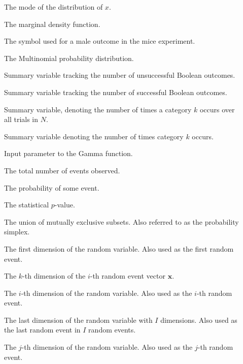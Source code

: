 \begin{description}
	\item [\parbox{2cm}{$M[x]$}] \parbox{12.5cm}{The mode of the distribution of $x$.}
	\item [\parbox{2cm}{$m$}] \parbox{12.5cm}{The marginal density function.}
	\item [\parbox{2cm}{$M$}] \parbox{12.5cm}{The symbol used for a male outcome in the mice experiment.}
	\item [\parbox{2cm}{$Mul$}] \parbox{12.5cm}{The Multinomial probability distribution.}
	\item [\parbox{2cm}{$N_{0}$}] \parbox{12.5cm}{Summary variable tracking the number of unsuccessful Boolean outcomes.}
	\item [\parbox{2cm}{$N_{1}$}] \parbox{12.5cm}{Summary variable tracking the number of successful Boolean outcomes.}
	\item [\parbox{2cm}{$N_{k}$}] \parbox{12.5cm}{Summary variable, denoting the number of times a category $k$ occurs over all trials in $N$.}
	\item [\parbox{2cm}{$N_{K}$}] \parbox{12.5cm}{Summary variable denoting the number of times category $k$ occurs.}
	\item [\parbox{2cm}{$n$}] \parbox{12.5cm}{Input parameter to the Gamma function.}
	\item [\parbox{2cm}{$N$}] \parbox{12.5cm}{The total number of events observed.}
	\item [\parbox{2cm}{$P$}] \parbox{12.5cm}{The probability of some event.}
	\item [\parbox{2cm}{$p$}] \parbox{12.5cm}{The statistical $p$-value.}
	\item [\parbox{2cm}{$S$}] \parbox{12.5cm}{The union of mutually exclusive subsets. Also referred to as the probability simplex.}
	\item [\parbox{2cm}{$x_{1}$}] \parbox{12.5cm}{The first dimension of the random variable. Also used as the first random event.}
	\item [\parbox{2cm}{$x_{i,k}$}] \parbox{12.5cm}{The $k$-th dimension of the $i$-th random event vector $\boldsymbol{x}$.}
	\item [\parbox{2cm}{$x_{i}$}] \parbox{12.5cm}{The $i$-th dimension of the random variable. Also used as the $i$-th random event.}
	\item [\parbox{2cm}{$x_{I}$}] \parbox{12.5cm}{The last dimension of the random variable with $I$ dimensions. Also used as the last random event in $I$ random events.}
	\item [\parbox{2cm}{$x_{j}$}] \parbox{12.5cm}{The $j$-th dimension of the random variable. Also used as the $j$-th random event.}

\end{description}
